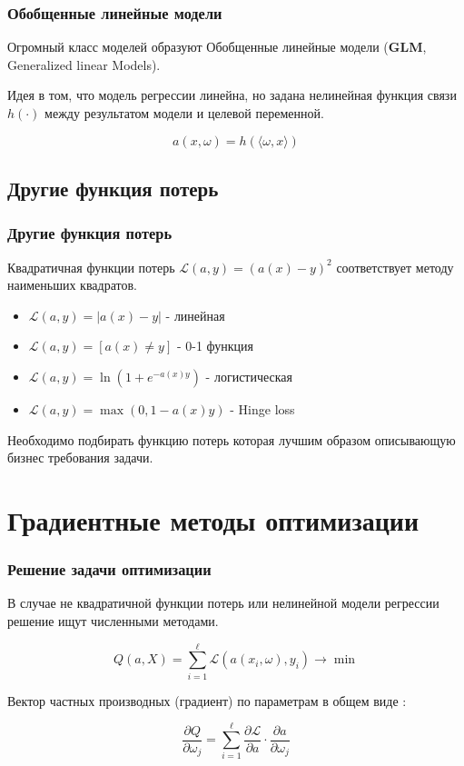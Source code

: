 \documentclass{beamer}
\begin{document}
	
	\begin{frame}
		\frametitle{Обобщенные линейные модели}
		Огромный класс моделей образуют Обобщенные линейные модели (\textbf{GLM}, Generalized linear Models).
		
		\vspace{5pt}
		
		Идея в том, что модель регрессии линейна, но задана нелинейная функция связи $h(\cdot)$ между результатом модели и целевой переменной.
		
		\[
		a(x, \omega) = h(\langle \omega, x \rangle)
		\]
	\end{frame}
	
	\subsection{Другие функция потерь}
	
	\begin{frame}
		\frametitle{Другие функция потерь}
		Квадратичная функции потерь $\mathcal{L}(a, y) = (a(x) - y)^2$ соответствует методу наименьших квадратов. 
		
		\vspace{5pt}
		
		\begin{itemize}
			\item $\mathcal{L}(a, y) = |a(x) - y|$ - линейная
			\item $\mathcal{L}(a, y) = [a(x) \ne y]$ - 0-1 функция
			\item $\mathcal{L}(a, y) = \ln(1 + e^{- a(x) y})$ - логистическая
			\item $\mathcal{L}(a, y) = \max(0, 1 - a(x) y)$ - Hinge loss
		\end{itemize}
		
		\vspace{5pt}
		
		Необходимо подбирать функцию потерь которая лучшим образом описывающую бизнес требования задачи.
	\end{frame}
	
	
	\section{Градиентные методы оптимизации}
	
	
	\begin{frame}
		\frametitle{Решение задачи оптимизации}
		В случае не квадратичной функции потерь или нелинейной модели регрессии решение ищут численными методами.
		
		\[
		Q(a, X) = \sum_{i=1}^{\ell} \mathcal{L}(a(x_i, \omega), y_i) \rightarrow \min
		\]
		
		
		Вектор частных производных (градиент) по параметрам в общем виде :
	
		\[
		\frac{\partial Q}{\partial \omega_j} = \sum_{i=1}^{\ell} \frac{\partial \mathcal{L}}{\partial a} \cdot \frac{\partial a}{\partial \omega_j}
		\]
	\end{frame}
	
\end{document}
